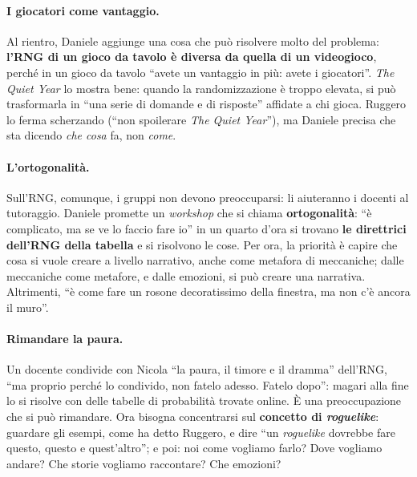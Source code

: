 \paragraph{I giocatori come vantaggio.} Al rientro, Daniele aggiunge una cosa che può
risolvere molto del problema: \textbf{l'RNG di un gioco da tavolo è diversa da quella di
un videogioco}, perché in un gioco da tavolo ``avete un vantaggio in più: avete i
giocatori''. \emph{The Quiet Year} lo mostra bene: quando la randomizzazione è troppo
elevata, si può trasformarla in ``una serie di domande e di risposte'' affidate a chi
gioca. Ruggero lo ferma scherzando (``non spoilerare \emph{The Quiet Year}''), ma Daniele
precisa che sta dicendo \emph{che cosa} fa, non \emph{come}.

\paragraph{L'ortogonalità.} Sull'RNG, comunque, i gruppi non devono preoccuparsi: li
aiuteranno i docenti al tutoraggio. Daniele promette un \emph{workshop} che si chiama
\textbf{ortogonalità}: ``è complicato, ma se ve lo faccio fare io'' in un quarto d'ora si
trovano \textbf{le direttrici dell'RNG della tabella} e si risolvono le cose. Per ora, la
priorità è capire che cosa si vuole creare a livello narrativo, anche come metafora di
meccaniche; dalle meccaniche come metafore, e dalle emozioni, si può creare una
narrativa. Altrimenti, ``è come fare un rosone decoratissimo della finestra, ma non c'è
ancora il muro''.

\paragraph{Rimandare la paura.} Un docente condivide con Nicola ``la paura, il timore e il
dramma'' dell'RNG, ``ma proprio perché lo condivido, non fatelo adesso. Fatelo dopo'':
magari alla fine lo si risolve con delle tabelle di probabilità trovate online. È una
preoccupazione che si può rimandare. Ora bisogna concentrarsi sul \textbf{concetto di
\emph{roguelike}}: guardare gli esempi, come ha detto Ruggero, e dire ``un
\emph{roguelike} dovrebbe fare questo, questo e quest'altro''; e poi: noi come vogliamo
farlo? Dove vogliamo andare? Che storie vogliamo raccontare? Che emozioni?

